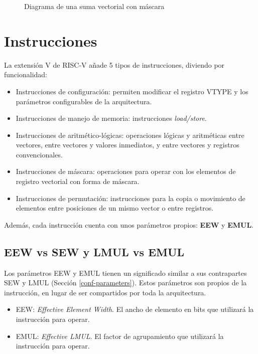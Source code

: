 \begin{figure}[H]

\caption {Diagrama de una suma vectorial con máscara}
\label{fig:masked-operation}
\end{figure}

\section{Instrucciones}
La extensión V de RISC-V añade 5 tipos de instrucciones, diviendo por funcionalidad:

\begin{itemize}
    \item Instrucciones de configuración: permiten modificar el registro VTYPE y los parámetros configurables de la arquitectura.
    \item Instrucciones de manejo de memoria: instrucciones \textit{load/store}.
    \item Instrucciones de aritmético-lógicas: operaciones lógicas y aritméticas entre vectores, entre vectores y valores inmediatos, y entre vectores y registros convencionales.
    \item Instrucciones de máscara: operaciones para operar con los elementos de registro vectorial con forma de máscara.
    \item Instrucciones de permutación: instrucciones para la copia o movimiento de elementos entre posiciones de un mismo vector o entre registros.
\end{itemize}

Además, cada instrucción cuenta con unos parámetros propios: \textbf{EEW} y \textbf{EMUL}.

\subsection{EEW vs SEW y LMUL vs EMUL}
Los parámetros EEW y EMUL tienen un significado similar a sus contrapartes SEW y LMUL (Sección \ref{conf-parameters}). Estos parámetros son propios de la instrucción, en lugar de ser compartidos por toda la arquitectura.
\begin{itemize}
    \item EEW: \textit{Effective Element Width}. El ancho de elemento en bits que utilizará la instrucción para operar.
    \item EMUL: \textit{Effective LMUL}. El factor de agrupamiento que utilizará la instrucción para operar.
\end{itemize}

